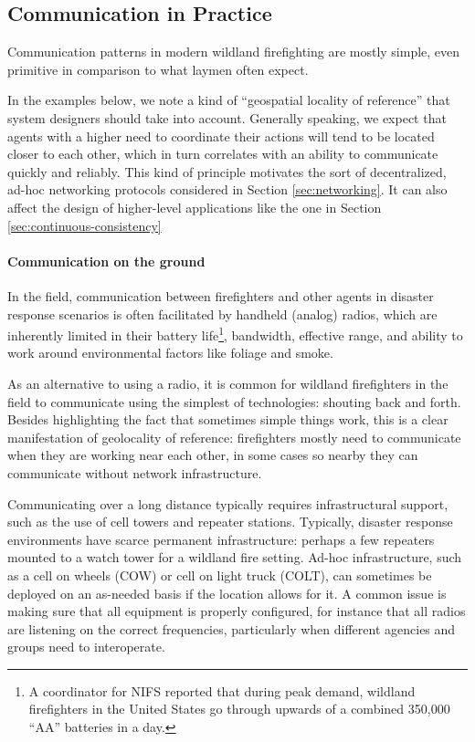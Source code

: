 \documentclass[]             %
{NASA}                       %
\theoremstyle{definition}
\begin{document}
\subsection{Communication in Practice}\label{communication-in-practice}

Communication patterns in modern wildland firefighting are mostly
simple, even primitive in comparison to what laymen often expect.

In the examples below, we note a kind of ``geospatial locality of
reference'' that system designers should take into account. Generally
speaking, we expect that agents with a higher need to coordinate their
actions will tend to be located closer to each other, which in turn
correlates with an ability to communicate quickly and reliably. This
kind of principle motivates the sort of decentralized, ad-hoc networking
protocols considered in Section \ref{sec:networking}. It can also affect
the design of higher-level applications like the one in Section
\ref{sec:continuous-consistency}

\paragraph{Communication on the ground}

In the field, communication between firefighters and other agents in
disaster response scenarios is often facilitated by handheld (analog)
radios, which are inherently limited in their battery life\footnote{A
  coordinator for NIFS reported that during peak demand, wildland
  firefighters in the United States go through upwards of a combined
  350,000 ``AA'' batteries in a day.}, bandwidth, effective range, and
ability to work around environmental factors like foliage and smoke.

As an alternative to using a radio, it is common for wildland
firefighters in the field to communicate using the simplest of
technologies: shouting back and forth. Besides highlighting the fact
that sometimes simple things work, this is a clear manifestation of
geolocality of reference: firefighters mostly need to communicate when
they are working near each other, in some cases so nearby they can
communicate without network infrastructure.

Communicating over a long distance typically requires infrastructural support, such as the use of cell towers and repeater stations. Typically, disaster
response environments have scarce permanent infrastructure: perhaps a few repeaters mounted to a watch tower for a wildland fire setting. Ad-hoc
infrastructure, such as a cell on wheels (COW) or cell on light truck
(COLT), can sometimes be deployed on an as-needed basis if the location allows for
it. A common issue is making sure that all equipment is properly
configured, for instance that all radios are listening on the correct
frequencies, particularly when different agencies and groups need to
interoperate.
\end{document}

